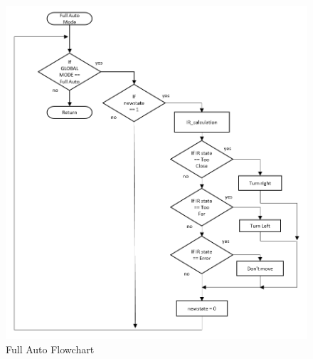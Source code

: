 \documentclass{article}
\begin{document}
	\begin{figure}[h]
		\includegraphics[scale=0.5]{Full_auto_flow.png}
		\centering
		\caption{Full Auto Flowchart}
	\end{figure}
	
	
\end{document}
